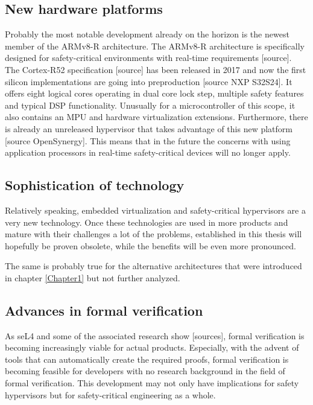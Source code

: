 \subsection{New hardware platforms}
Probably the most notable development already on the horizon is the newest member of the ARMv8-R architecture. The ARMv8-R architecture is specifically designed for safety-critical environments with real-time requirements [source]. %
The Cortex-R52 specification [source] has been released in 2017 and now the first silicon implementations are going into preproduction [source NXP S32S24]. It offers eight logical cores operating in dual core lock step, multiple safety features and typical \gls{DSP} functionality. Unusually for a microcontroller of this scope, it also contains an \gls{MPU} and hardware virtualization extensions. Furthermore, there is already an unreleased hypervisor that takes advantage of this new platform [source OpenSynergy]. This means that in the future the concerns with using application processors in real-time safety-critical devices will no longer apply.

\subsection{Sophistication of technology}
Relatively speaking, embedded virtualization and safety-critical hypervisors are a very new technology. Once these technologies are used in more products and mature with their challenges a lot of the problems, established in this thesis will hopefully be proven obsolete, while the benefits will be even more pronounced. 

The same is probably true for the alternative architectures that were introduced in chapter \ref{Chapter1} but not further analyzed.
\subsection{Advances in formal verification}
As seL4 and some of the associated research show [sources], formal verification is becoming increasingly viable for actual products. Especially, with the advent of tools that can automatically create the required proofs, formal verification is becoming feasible for developers with no research background in the field of formal verification. This development may not only have implications for safety hypervisors but for safety-critical engineering as a whole.

